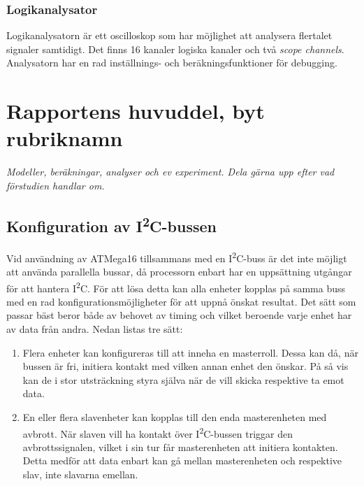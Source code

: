 \documentclass[11pt]{article}
\begin{document}
\begin{flushleft}
\subsubsection{Logikanalysator}

Logikanalysatorn är ett oscilloskop som har möjlighet att analysera flertalet signaler samtidigt. Det finns 16 kanaler logiska kanaler och  två \textit{scope channels}. Analysatorn har en rad inställnings- och beräkningsfunktioner för debugging. 

\pagebreak

\section{Rapportens huvuddel, byt rubriknamn}
\textit{Modeller, beräkningar, analyser och ev experiment. Dela gärna upp efter vad förstudien handlar om.}

\subsection{Konfiguration av I\textsuperscript{2}C-bussen}

Vid användning av ATMega16 tillsammans med en I\textsuperscript{2}C-buss är det inte möjligt att använda parallella bussar, då processorn enbart har en uppsättning utgångar för att hantera I\textsuperscript{2}C. För att lösa detta kan alla enheter kopplas på samma buss med en rad konfigurationsmöjligheter för att uppnå önskat resultat. Det sätt som passar bäst beror både av behovet av timing och vilket beroende varje enhet har av data från andra. Nedan listas tre sätt:

\begin{enumerate}
 \item Flera enheter kan konfigureras till att inneha en masterroll. Dessa kan då, när bussen är fri, initiera kontakt med vilken annan enhet den önskar. På så vis kan de i stor utsträckning styra själva när de vill skicka respektive ta emot data.
 
 \item En eller flera slavenheter kan kopplas till den enda masterenheten med avbrott. När slaven vill ha kontakt över I\textsuperscript{2}C-bussen triggar den avbrottssignalen, vilket i sin tur får masterenheten att initiera kontakten. Detta medför att data enbart kan gå mellan masterenheten och respektive slav, inte slavarna emellan.
 

\end{enumerate}
\end{flushleft}
\end{document}
